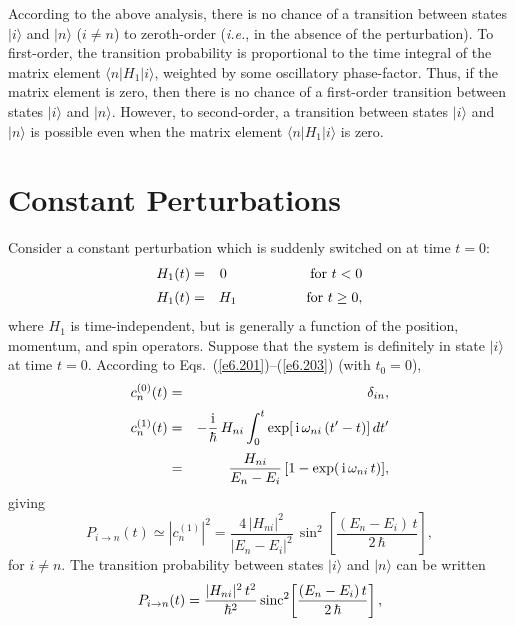 According to the above analysis, there is no chance of a
transition between states $|i\rangle$ and $|n\rangle$ ($i\neq n$)
to zeroth-order ({\em i.e.}, in the absence of the perturbation). To
first-order, the transition probability is proportional to
the time integral of the matrix element $\langle n|H_1| i\rangle$,
weighted by some oscillatory phase-factor. Thus, if the matrix
element is zero, then there is no chance of a first-order transition between
states $|i\rangle$ and $|n\rangle$. However, to second-order,
a transition between states $|i\rangle$ and $|n\rangle$ is possible
even when the
matrix element $\langle n|H_1| i\rangle$ is zero.

\section{Constant Perturbations}
Consider a constant perturbation which is suddenly switched on at time
$t=0$:
\begin{eqnarray}
H_1(t) &=& 0 \mbox{\hspace{2.1cm}for $t<0$}\nonumber \\[0.5ex]
H_1(t) &=& H_1\mbox{\hspace{1.75cm}for $t\geq 0$},\label{e6.207}
\end{eqnarray}
where $H_1$ is time-independent, but is generally a function of 
the position,
momentum, and spin operators. Suppose that the system is definitely
in state $|i\rangle$ at time $t=0$. According to Eqs.~(\ref{e6.201})--(\ref{e6.203}) (with
$t_0 = 0$),
\begin{eqnarray}
c_n^{(0)}(t) &=& \delta_{in},\\[0.5ex]
c_n^{(1)}(t) &= &-\frac{{\rm i}}{\hbar}\, H_{ni} \int_0^t \exp[\,{\rm i}\,
\omega_{ni}\,(t'-t)] \, dt'\nonumber\\[0.5ex]\label{e6.209}
&=& \frac{H_{ni}}{E_n - E_i}\, [1- \exp(\,{\rm i}\,\omega_{ni}\,t)],
\end{eqnarray}
giving
\begin{equation}
P_{i\rightarrow n}(t) \simeq |c_n^{(1)}|^2 = \frac{4\,|H_{ni}|^2}{|E_n - E_i|^2}\,
\sin^2\!\left[ \frac{(E_n-E_i)\,t}{2\,\hbar}\right],
\end{equation}
for $i\neq n$. 
The transition probability between states $|i\rangle$ and $|n\rangle$
can be written
\begin{equation}\label{e6.211}
P_{i\rightarrow n}(t) = \frac{|H_{ni}|^2 \,t^2}{\hbar^2} \,{\rm sinc}^2\!\left[ \frac{(E_n-E_i)\,t}{2\,\hbar}\right],
\end{equation}
